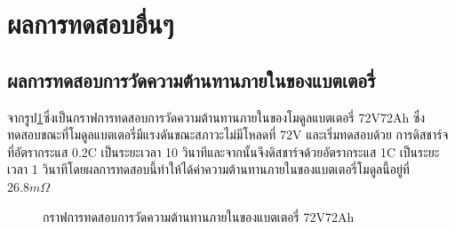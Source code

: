 \section{ผลการทดสอบอื่นๆ}
\subsection{ผลการทดสอบการวัดความต้านทานภายในของแบตเตอรี่}
จากรูป\ref{fig:DCIR_Test}ซึ่งเป็นกราฟการทดสอบการวัดความต้านทานภายในของโมดูลแบตเตอรี่ 72V72Ah ซึ่งทดสอบขณะที่โมดูลแบตเตอรี่มีแรงดันขณะสภาวะไม่มีโหลดที่ 72V และเริ่มทดสอบด้วย
การดิสชาร์จที่อัตรากระแส 0.2C เป็นระยะเวลา 10 วินาทีและจากนั้นจึงดิสชาร์จด้วยอัตรากระแส 1C เป็นระยะเวลา 1 วินาทีโดยผลการทดสอบนี้ทำให้ได้ค่าความต้านทานภายในของแบตเตอรี่โมดูลนี้อยู่ที่
$26.8m\Omega$
\begin{center}
	\begin{figure}[H]
		\centering
		\captionsetup{justification=centering,margin=2cm}
		\caption{กราฟการทดสอบการวัดความต้านทานภายในของแบตเตอรี่ 72V72Ah}
		\label{fig:DCIR_Test}
	\end{figure}
\end{center}
\pagebreak
